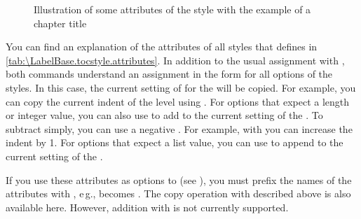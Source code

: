 \begin{description}
\begin{figure}
{%
    }
    \caption{Illustration of some attributes of the 
      style with the example of a chapter title}%
  \end{figure}
\end{description}
You can find an explanation of the attributes of all styles that
 defines in \autoref{tab:\LabelBase.tocstyle.attributes}.
In addition to the usual assignment with
, both commands understand an assignment in
the form  for all options of the
\KOMAScript{} styles. In this case, the current setting of  for the
 will be copied. For example, you can copy the current
indent of the  level using . For
options that expect a length or integer value, you can also use
 to add  to the current setting
of the . To subtract simply, you can use a negative .
For example, with  you can increase the indent by
1. For options that expect a list value, you can use
 to append  to the current
setting of the .

If you use these attributes as
options to  (see
), you must prefix the names of the
attributes with , e\,g.,  becomes
. The copy operation with \Option{:=} described above is
also available here. However, addition with \Option{+=} is not currently
supported.

